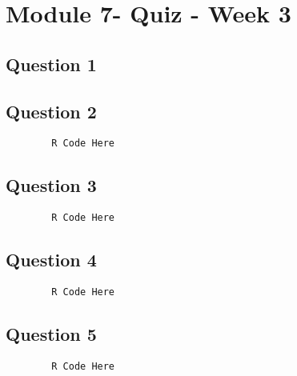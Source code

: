 \documentclass[french]{article}
\begin{document}
	
	\section*{Module 7- Quiz - Week 3}
	\subsection*{Question 1}
	
	\newpage
	\subsection*{Question 2}
	
	\begin{framed}
		\begin{verbatim}
		R Code Here
		\end{verbatim}
	\end{framed}
	\newpage
	\subsection*{Question 3}
	\begin{framed}
		\begin{verbatim}
		R Code Here
		\end{verbatim}
	\end{framed}
	\newpage
	\subsection*{Question 4}
	\begin{framed}
		\begin{verbatim}
		R Code Here
		\end{verbatim}
	\end{framed}
	\newpage
	\subsection*{Question 5}
	\begin{framed}
		\begin{verbatim}
		R Code Here
		\end{verbatim}
	\end{framed}
\end{document}
